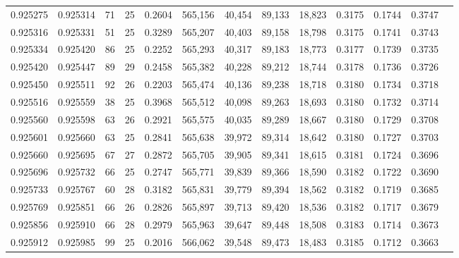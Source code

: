 \begin{tabular}{rrrrrrrrrrrrr}
0.925275 & 0.925314 &    71 &  25 &                                     0.2604 & 565,156 &  40,454 &  89,133 &  18,823 & 0.3175 & 0.1744 & 0.3747 \\
0.925316 & 0.925331 &    51 &  25 &                                     0.3289 & 565,207 &  40,403 &  89,158 &  18,798 & 0.3175 & 0.1741 & 0.3743 \\
0.925334 & 0.925420 &    86 &  25 &                                     0.2252 & 565,293 &  40,317 &  89,183 &  18,773 & 0.3177 & 0.1739 & 0.3735 \\
0.925420 & 0.925447 &    89 &  29 &                                     0.2458 & 565,382 &  40,228 &  89,212 &  18,744 & 0.3178 & 0.1736 & 0.3726 \\
0.925450 & 0.925511 &    92 &  26 &                                     0.2203 & 565,474 &  40,136 &  89,238 &  18,718 & 0.3180 & 0.1734 & 0.3718 \\
0.925516 & 0.925559 &    38 &  25 &                                     0.3968 & 565,512 &  40,098 &  89,263 &  18,693 & 0.3180 & 0.1732 & 0.3714 \\
0.925560 & 0.925598 &    63 &  26 &                                     0.2921 & 565,575 &  40,035 &  89,289 &  18,667 & 0.3180 & 0.1729 & 0.3708 \\
0.925601 & 0.925660 &    63 &  25 &                                     0.2841 & 565,638 &  39,972 &  89,314 &  18,642 & 0.3180 & 0.1727 & 0.3703 \\
0.925660 & 0.925695 &    67 &  27 &                                     0.2872 & 565,705 &  39,905 &  89,341 &  18,615 & 0.3181 & 0.1724 & 0.3696 \\
0.925696 & 0.925732 &    66 &  25 &                                     0.2747 & 565,771 &  39,839 &  89,366 &  18,590 & 0.3182 & 0.1722 & 0.3690 \\
0.925733 & 0.925767 &    60 &  28 &                                     0.3182 & 565,831 &  39,779 &  89,394 &  18,562 & 0.3182 & 0.1719 & 0.3685 \\
0.925769 & 0.925851 &    66 &  26 &                                     0.2826 & 565,897 &  39,713 &  89,420 &  18,536 & 0.3182 & 0.1717 & 0.3679 \\
0.925856 & 0.925910 &    66 &  28 &                                     0.2979 & 565,963 &  39,647 &  89,448 &  18,508 & 0.3183 & 0.1714 & 0.3673 \\
0.925912 & 0.925985 &    99 &  25 &                                     0.2016 & 566,062 &  39,548 &  89,473 &  18,483 & 0.3185 & 0.1712 & 0.3663 \\

\end{tabular}
